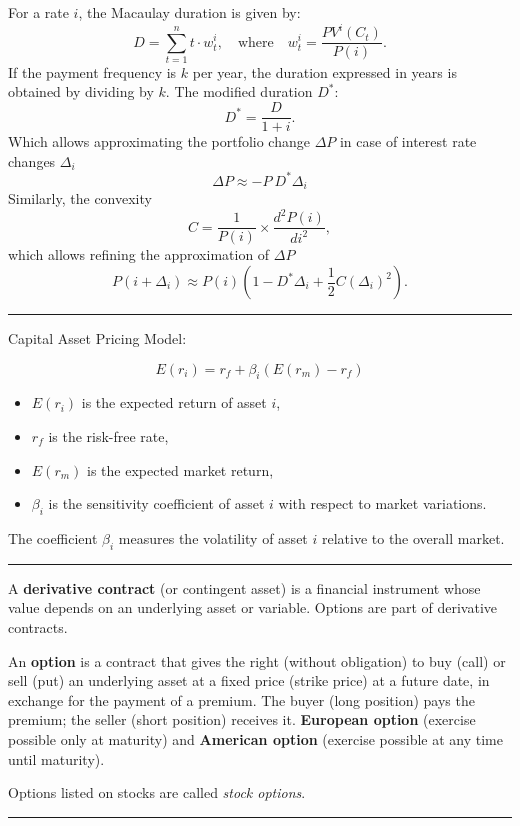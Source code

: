 \begin{f}

For a rate \(i\), the Macaulay duration is given by:
\[ 		
D = \sum_{t=1}^{n} t \cdot w^i_t, \quad \text{where} \quad w^i_t = \frac{PV^i(C_t)}{P(i)}.
 \]	
If the payment frequency is \(k\) per year, the duration expressed in years is obtained by dividing by \(k\).
The modified duration \(D^*\):
\[ 	
D^* = \frac{D}{1 + i}.
 \]
Which allows approximating the portfolio change \(\Delta P\) in case of interest rate changes \(\Delta_i\)
\[ 
\Delta P \approx -P\ D^* \Delta_i 
 \]
Similarly, the convexity
\[ 	
C = \frac{1}{P(i)} \times \frac{d^2 P(i)}{di^2},
 \]
which allows refining the approximation of \(\Delta P\)
\[ 	
P(i + \Delta_i) \approx P(i) \left( 1 -D^*\Delta_i + \frac{1}{2} C (\Delta_i)^2 \right).
 \]
\end{f}
\hrule



\begin{f}[CAPM]
  Capital Asset Pricing Model:

\[
E(r_i) = r_f + \beta_i (E(r_m) - r_f)
\]

\begin{itemize}
    \item \( E(r_i) \) is the expected return of asset \( i \),
    \item \( r_f \) is the risk-free rate,
    \item \( E(r_m) \) is the expected market return,
    \item \( \beta_i \) is the sensitivity coefficient of asset \( i \) with respect to market variations.
\end{itemize}

The coefficient \( \beta_i \) measures the volatility of asset \( i \) relative to the overall market.

\end{f}
\hrule


\begin{f}

A \textbf{derivative contract} (or contingent asset) is a financial instrument whose value depends on an underlying asset or variable. Options are part of derivative contracts.


An \textbf{option} is a contract that gives the right (without obligation) to buy (call) or sell (put) an underlying asset at a fixed price (strike price) at a future date, in exchange for the payment of a premium.
The buyer (long position) pays the premium; the seller (short position) receives it. \textbf{European option} (exercise possible only at maturity) and  
 \textbf{American option} (exercise possible at any time until maturity).

Options listed on stocks are called \textit{stock options}.

\end{f}
\hrule


